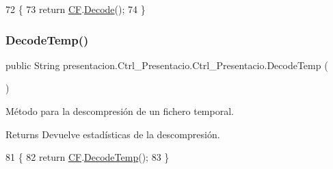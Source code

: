 \begin{DoxyCode}
72                            \{
73         \textcolor{keywordflow}{return} \hyperlink{classpresentacion_1_1Ctrl__Presentacio_1_1Ctrl__Presentacio_af46ef2ef420276ff830c2f0ff8c1a7e6}{CF}.\hyperlink{classdomini_1_1folders_1_1Ctrl__FolderFile_a5d28ac7f5223ecd40a242148e86447c1}{Decode}();
74     \}
\end{DoxyCode}
\mbox{\label{classpresentacion_1_1Ctrl__Presentacio_1_1Ctrl__Presentacio_aa9c12bc59a7e9fa0ccd09c0e007d4a4c}} 
\subsubsection{\texorpdfstring{Decode\+Temp()}{DecodeTemp()}}
{\footnotesize\ttfamily public String presentacion.\+Ctrl\+\_\+\+Presentacio.\+Ctrl\+\_\+\+Presentacio.\+Decode\+Temp (\begin{DoxyParamCaption}{ }\end{DoxyParamCaption})\hspace{0.3cm}{\ttfamily [inline]}}



Método para la descompresión de un fichero temporal. 

\begin{DoxyReturn}{Returns}
Devuelve estadísticas de la descompresión. 
\end{DoxyReturn}

\begin{DoxyCode}
81                                \{
82         \textcolor{keywordflow}{return} \hyperlink{classpresentacion_1_1Ctrl__Presentacio_1_1Ctrl__Presentacio_af46ef2ef420276ff830c2f0ff8c1a7e6}{CF}.\hyperlink{classdomini_1_1folders_1_1Ctrl__FolderFile_afa0f6968113855feccccfdbacc00444e}{DecodeTemp}();
83     \}
\end{DoxyCode}
\mbox{\label{classpresentacion_1_1Ctrl__Presentacio_1_1Ctrl__Presentacio_a83ea715afbbe389c6f1fb68f29121205}} 
